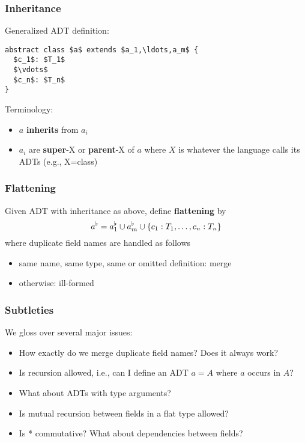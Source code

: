 \begin{frame}[fragile]\frametitle{Inheritance}
Generalized ADT definition:

\begin{lstlisting}
abstract class $a$ extends $a_1,\ldots,a_m$ {
  $c_1$: $T_1$
  $\vdots$
  $c_n$: $T_n$
}
\end{lstlisting}

Terminology:
\begin{itemize}
\item $a$ \textbf{inherits} from $a_i$
\item $a_i$ are \textbf{super}-X or \textbf{parent}-X of $a$ where $X$ is whatever the language calls its ADTs (e.g., X=class)
\end{itemize}
\end{frame}

\begin{frame}\frametitle{Flattening}
Given ADT with inheritance as above, define \textbf{flattening} by
 \[a^\flat=a_1^\flat\cup a_m^\flat\cup \{c_1:T_1,\ldots,c_n:T_n\}\]
 where duplicate field names are handled as follows
  \begin{itemize}
   \item same name, same type, same or omitted definition: merge
   \item otherwise: ill-formed
  \end{itemize}
\end{frame}

\begin{frame}\frametitle{Subtleties}
We gloss over several major issues:
\begin{itemize}
\item How exactly do we merge duplicate field names? Does it always work?
\item Is recursion allowed, i.e., can I define an ADT $a=A$ where $a$ occurs in $A$?
\item What about ADTs with type arguments?
\item Is mutual recursion between fields in a flat type allowed?
\item Is * commutative? What about dependencies between fields?
\end{itemize}
\end{frame}

